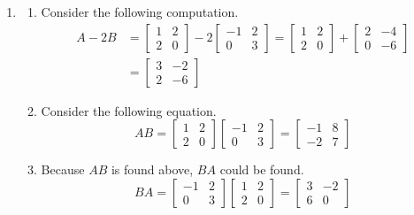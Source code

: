 \documentclass[../main.tex]{subfiles}
\begin{document}
\begin{enumerate}
\item
\begin{enumerate}
\item
Consider the following computation.
\begin{align*}
    A - 2B
    &=
    \begin{bmatrix}
        1 & 2 \\
        2 & 0
    \end{bmatrix}
    -
    2\begin{bmatrix}
        -1 & 2 \\
        0  & 3
    \end{bmatrix}
    =
    \begin{bmatrix}
        1 & 2 \\
        2 & 0
    \end{bmatrix}
    +
    \begin{bmatrix}
        2 & -4 \\
        0 & -6
    \end{bmatrix} \\
    &=
    \begin{bmatrix}
        3 & -2 \\
        2 & -6
    \end{bmatrix}
\end{align*}
\item
Consider the following equation.
\[
AB =
\begin{bmatrix}
    1 & 2 \\
    2 & 0
\end{bmatrix}
\begin{bmatrix}
    -1 & 2 \\
    0  & 3
\end{bmatrix}
=
\begin{bmatrix}
    -1 & 8 \\
    -2 & 7
\end{bmatrix}
\]
\item
Because $AB$ is found above, $BA$ could be found.
\[
BA =
\begin{bmatrix}
    -1 & 2 \\
    0  & 3
\end{bmatrix}
\begin{bmatrix}
    1 & 2 \\
    2 & 0
\end{bmatrix}
=
\begin{bmatrix}
    3 & -2 \\
    6 & 0
\end{bmatrix}
\]
\end{enumerate}
\end{enumerate}
\end{document}
